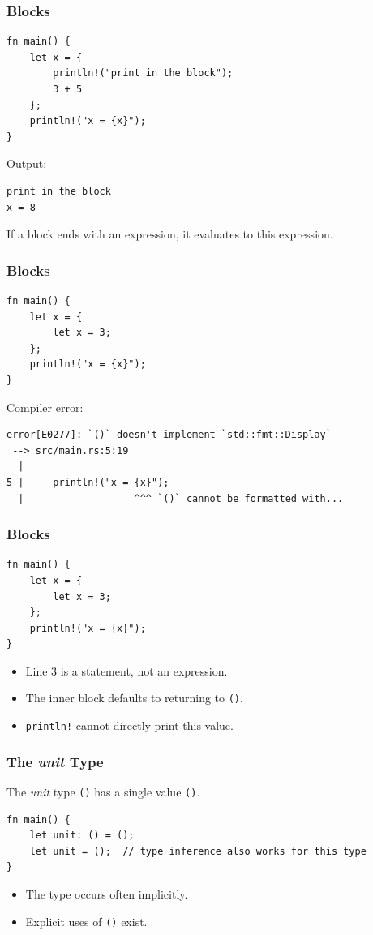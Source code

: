 \begin{frame}[fragile]
    \frametitle{Blocks}
    \begin{verbatim}
fn main() {
    let x = {
        println!("print in the block");
        3 + 5
    };
    println!("x = {x}");
}
    \end{verbatim}
    \pause
    \vfill
    Output:
    \begin{verbatim}
print in the block
x = 8
    \end{verbatim}
    \pause
    \vfill
    If a block ends with an expression, it evaluates to this expression.
\end{frame}

\begin{frame}[fragile]
    \frametitle{Blocks}
    \begin{verbatim}
fn main() {
    let x = {
        let x = 3;
    };
    println!("x = {x}");
}
    \end{verbatim}
    \pause
    \vfill
    Compiler error:
    \begin{verbatim}
error[E0277]: `()` doesn't implement `std::fmt::Display`
 --> src/main.rs:5:19
  |
5 |     println!("x = {x}");
  |                   ^^^ `()` cannot be formatted with...
    \end{verbatim}
\end{frame}

\begin{frame}[fragile]
    \frametitle{Blocks}
    \begin{verbatim}
fn main() {
    let x = {
        let x = 3;
    };
    println!("x = {x}");
}
    \end{verbatim}
    \pause
    \vfill
    \begin{itemize}
        \item Line 3 is a statement, not an expression.
        \item The inner block defaults to returning to \texttt{()}.
        \item \texttt{println!} cannot directly print this value.
    \end{itemize}
\end{frame}


\begin{frame}[fragile]
    \frametitle{The \textit{unit} Type}
    The \textit{unit} type \texttt{()} has a single value \texttt{()}.
    \pause
    \vfill
    \begin{verbatim}
fn main() {
    let unit: () = ();
    let unit = ();  // type inference also works for this type
}
    \end{verbatim}
    \pause
    \vfill
    \begin{itemize}
        \item The type occurs often implicitly.
        \item Explicit uses of \texttt{()} exist.
    \end{itemize}
\end{frame}

